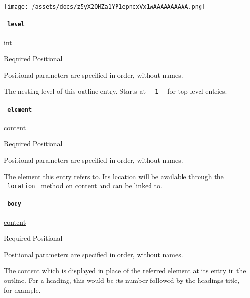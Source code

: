 \texttt{[image: /assets/docs/z5yX2QHZa1YP1epncxVx1wAAAAAAAAAA.png]}

\paragraph{\texorpdfstring{\texttt{\ level\ }}{ level }}\label{definitions-entry-level}

\href{/docs/reference/foundations/int/}{int}

{Required} {{ Positional }}

\label{definitions-entry-level-positional-tooltip}
Positional parameters are specified in order, without names.

The nesting level of this outline entry. Starts at
\texttt{\ }{\texttt{\ 1\ }}\texttt{\ } for top-level entries.

\paragraph{\texorpdfstring{\texttt{\ element\ }}{ element }}\label{definitions-entry-element}

\href{/docs/reference/foundations/content/}{content}

{Required} {{ Positional }}

\label{definitions-entry-element-positional-tooltip}
Positional parameters are specified in order, without names.

The element this entry refers to. Its location will be available through
the
\href{/docs/reference/foundations/content/\#definitions-location}{\texttt{\ location\ }}
method on content and can be \href{/docs/reference/model/link/}{linked}
to.

\paragraph{\texorpdfstring{\texttt{\ body\ }}{ body }}\label{definitions-entry-body}

\href{/docs/reference/foundations/content/}{content}

{Required} {{ Positional }}

\label{definitions-entry-body-positional-tooltip}
Positional parameters are specified in order, without names.

The content which is displayed in place of the referred element at its
entry in the outline. For a heading, this would be its number followed
by the heading\textquotesingle s title, for example.

